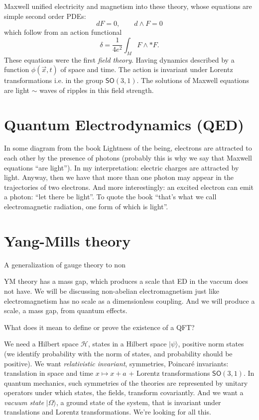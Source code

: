 Maxwell unified electricity and magnetism into these theory, whose equations are
simple second order PDEs:
\[dF=0,\qquad d\wedge F=0\]
which follow from an action functional
\[\delta=\frac{1}{4e^2}\int_{M}F\wedge * F.\]
These equations were the first \textit{field theory}. Having dynamics described
by a function $\phi(\vec{x},t)$ of space and time. The action is invariant under
Lorentz transformations i.e. in the group $\mathsf{SO}(3,1)$. The solutions of
Maxwell equations are light $\sim$ waves of ripples in this field strength.

\section{Quantum Electrodynamics (QED)}
\label{section-QED}

In some diagram from the book Lightness of the being, electrons are attracted to
each other by the presence of photons (probably this is why we say that Maxwell
equations ``are light''). In my interpretation: electric charges are attracted
by light. Anyway, then we have that more than one photon may appear in the
trajectories of two electrons. And more interestingly: an excited electron can
emit a photon: ``let there be light''. To quote the book ``that's what we call
electromagnetic radiation, one form of which is light''.

\section{Yang-Mills theory}
\label{section-Yang-Mills-theory}

A generalization of gauge theory to non 

YM theory has a mass gap, which produces a scale that ED in the vaccum does not
have. We will be discussing non-abelian electromagnetism just like
electromagnetism has no scale as a dimensionless coupling. And we will produce a
scale, a mass gap, from quantum effects.

What does it mean to define or prove the existence of a QFT?

We need a Hilbert space $\mathcal{H}$, states in a Hilbert space $|\psi\rangle$,
positive norm states (we identify probability with the norm of states, and
probability should be positive). We want {\it relativistic invariant},
symmetries, Poincaré invariants: translation in space and time $x \mapsto x+a$ +
Lorentz transformations $\mathsf{SO}(3,1)$. In quantum mechanics, such
symmetries of the theories are represented by unitary operators under which
states, the fields, transform covariantly. And we want a {\it vacuum
state} $|\Omega\rangle$, a ground state of the system, that is invariant under
translations and Lorentz transformations. We're looking for all this.

